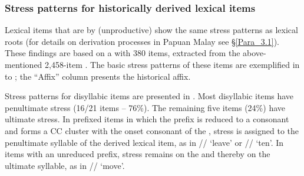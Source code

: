 \subsubsection[Stress patterns for {historically derived} lexical items]{Stress patterns for {historically derived} lexical items\label{Para_2.4.4.2}}

Lexical items that are  by (unproductive)  show the same stress patterns as lexical roots (for details on derivation processes in Papuan Malay see §\ref{Para_3.1}). These findings are based on a  with 380 items, extracted from the above-mentioned 2,458-item . The basic stress patterns of these items are exemplified in  to ; the ``Affix'' column presents the historical affix.



Stress patterns for disyllabic items are presented in . Most disyllabic items have penultimate stress (16/21 items – 76\%). The remaining five items (24\%) have ultimate stress. In prefixed items in which the prefix is reduced to a consonant and forms a CC cluster with the onset consonant of the , stress is assigned to the penultimate syllable of the derived lexical item, as in  // ‘leave’ or  // ‘ten’. In items with an unreduced prefix, stress remains on the  and thereby on the ultimate syllable, as in  // ‘move’.

